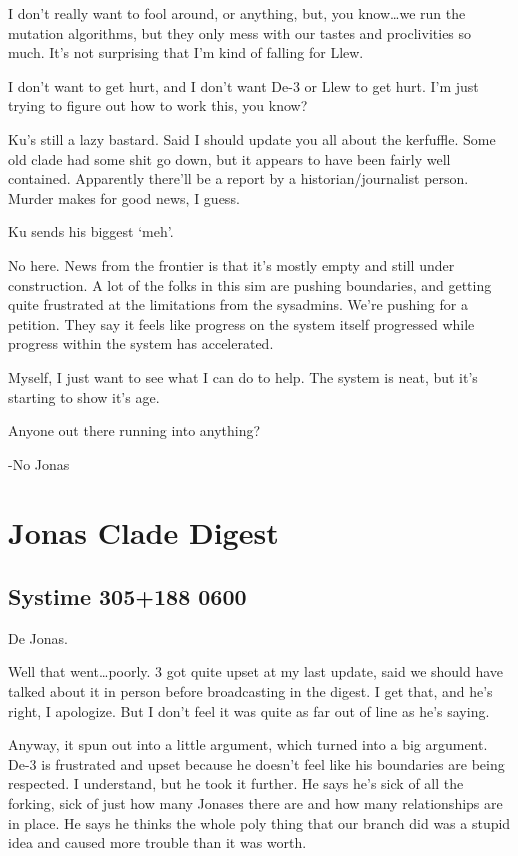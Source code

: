 I don't really want to fool around, or anything, but, you know\ldots{}we run the mutation algorithms, but they only mess with our tastes and proclivities so much. It's not surprising that I'm kind of falling for Llew.

I don't want to get hurt, and I don't want De-3 or Llew to get hurt. I'm just trying to figure out how to work this, you know?

\secdiv{}

\noindent Ku's still a lazy bastard. Said I should update you all about the kerfuffle. Some old clade had some shit go down, but it appears to have been fairly well contained. Apparently there'll be a report by a historian/journalist person. Murder makes for good news, I guess.

Ku sends his biggest `meh'.

\secdiv{}

\noindent No here. News from the frontier is that it's mostly empty and still under construction. A lot of the folks in this sim are pushing boundaries, and getting quite frustrated at the limitations from the sysadmins. We're pushing for a petition. They say it feels like progress on the system itself progressed while progress within the system has accelerated.

Myself, I just want to see what I can do to help. The system is neat, but it's starting to show it's age.

Anyone out there running into anything?

-No Jonas

\newpage
\hypertarget{jonas-clade-digest-2}{%
\section*{Jonas Clade Digest}\label{jonas-clade-digest-2}}

\hypertarget{systime-305188-0600}{%
\subsection*{Systime 305+188 0600}\label{systime-305188-0600}}

De Jonas.

Well that went\ldots{}poorly. 3 got quite upset at my last update, said we should have talked about it in person before broadcasting in the digest. I get that, and he's right, I apologize. But I don't feel it was quite as far out of line as he's saying.

Anyway, it spun out into a little argument, which turned into a big argument. De-3 is frustrated and upset because he doesn't feel like his boundaries are being respected. I understand, but he took it further. He says he's sick of all the forking, sick of just how many Jonases there are and how many relationships are in place. He says he thinks the whole poly thing that our branch did was a stupid idea and caused more trouble than it was worth.

